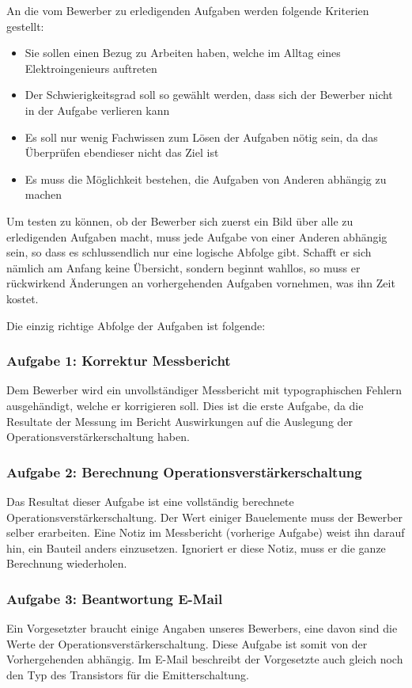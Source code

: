 An die vom Bewerber zu erledigenden Aufgaben werden folgende Kriterien gestellt:

\begin{itemize}
\item Sie sollen einen Bezug zu Arbeiten haben, welche im Alltag eines Elektroingenieurs auftreten
\item Der Schwierigkeitsgrad soll so gewählt werden, dass sich der Bewerber nicht in der Aufgabe verlieren kann \item Es soll nur wenig Fachwissen zum Lösen der Aufgaben nötig sein, da das Überprüfen ebendieser nicht das Ziel ist
\item Es muss die Möglichkeit bestehen, die Aufgaben von Anderen abhängig zu machen
\end{itemize}

Um testen zu können, ob der Bewerber sich zuerst ein Bild über alle zu erledigenden Aufgaben macht, muss jede Aufgabe von einer Anderen abhängig sein, so dass es schlussendlich nur eine logische Abfolge gibt. Schafft er sich nämlich am Anfang keine Übersicht, sondern beginnt wahllos, so muss er rückwirkend Änderungen an vorhergehenden Aufgaben vornehmen, was ihn Zeit kostet.

Die einzig richtige Abfolge der Aufgaben ist folgende:

\subsubsection{Aufgabe 1: Korrektur Messbericht}
Dem Bewerber wird ein unvollständiger Messbericht mit typographischen Fehlern ausgehändigt, welche er korrigieren soll. %
Dies ist die erste Aufgabe, da die Resultate der Messung im Bericht Auswirkungen auf die Auslegung der Operationsverstärkerschaltung haben.

\subsubsection{Aufgabe 2: Berechnung Operationsverstärkerschaltung}
Das Resultat dieser Aufgabe ist eine vollständig berechnete Operationsverstärkerschaltung. Der Wert einiger Bauelemente muss der Bewerber selber erarbeiten. Eine Notiz im Messbericht (vorherige Aufgabe) weist ihn darauf hin, ein Bauteil anders einzusetzen. Ignoriert er diese Notiz, muss er die ganze Berechnung wiederholen.

\subsubsection{Aufgabe 3: Beantwortung E-Mail}
Ein Vorgesetzter braucht einige Angaben unseres Bewerbers, eine davon sind die Werte der Operationsverstärkerschaltung. Diese Aufgabe ist somit von der Vorhergehenden abhängig. Im E-Mail beschreibt der Vorgesetzte auch gleich noch den Typ des Transistors für die Emitterschaltung.

